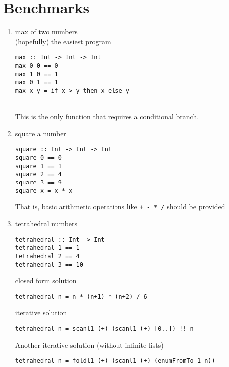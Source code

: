 \chapter{Benchmarks} \label{benchmarks}


\begin{enumerate}
	\item max of two numbers\\
	(hopefully) the easiest program \\
	\begin{lstlisting}
max :: Int -> Int -> Int
max 0 0 == 0
max 1 0 == 1
max 0 1 == 1
max x y = if x > y then x else y
	\end{lstlisting}
	\\
	This is the only function that requires a conditional branch.
%
	\item square a number
	\begin{lstlisting}
square :: Int -> Int -> Int
square 0 == 0
square 1 == 1
square 2 == 4
square 3 == 9
square x = x * x
	\end{lstlisting}
	That is, basic arithmetic operations like \lstinline!+ - * /! should be provided
%
	\item tetrahedral numbers \\
	\begin{lstlisting}
tetrahedral :: Int -> Int
tetrahedral 1 == 1
tetrahedral 2 == 4
tetrahedral 3 == 10
	\end{lstlisting}
	closed form solution
	\begin{lstlisting}
tetrahedral n = n * (n+1) * (n+2) / 6
	\end{lstlisting}
	iterative solution
	\begin{lstlisting}
tetrahedral n = scanl1 (+) (scanl1 (+) [0..]) !! n
	\end{lstlisting}
	Another iterative solution (without infinite lists)
	\begin{lstlisting}
tetrahedral n = foldl1 (+) (scanl1 (+) (enumFromTo 1 n))
	\end{lstlisting}

\end{enumerate}
